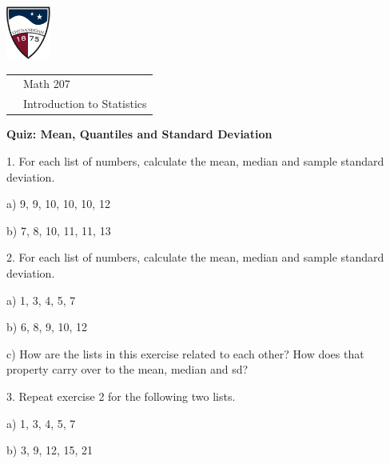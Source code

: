 \documentclass[10pt]{article}
\begin{document}
\pagestyle{empty}

\href{http://www.su.edu}{\includegraphics[height=1.75cm]{sulogo.eps}}
\vspace{-1.69cm}

{\small\hfill
\begin{tabular}{cl}
 & Math 207\\ & Introduction to Statistics\\
\end{tabular}
}

\setlength{\baselineskip}{1.05\baselineskip}

\begin{center}
\textbf{\large Quiz:  Mean, Quantiles and Standard Deviation}
\end{center}

1. For each list of numbers, calculate the mean, median and sample
standard deviation.

\hspace{10pt} a) 9, 9, 10, 10, 10, 12
\vspace{.45in}

\hspace{10pt} b) 7, 8, 10, 11, 11, 13
\vspace{.45in}

2. For each list of numbers, calculate the mean, median and sample
standard deviation.  

\hspace{10pt} a) 1, 3, 4, 5, 7
\vspace{.45in}

\hspace{10pt} b) 6, 8, 9, 10, 12
\vspace{.45in}

\hspace{10pt} c)  How are the lists in this exercise related to each other?
How does that property carry over to the mean, median and sd?
\vspace{.7in}


3. Repeat exercise 2 for the following two lists.

\hspace{10pt} a) 1, 3, 4, 5, 7
\vspace{.6in}

\hspace{10pt} b) 3, 9, 12, 15, 21
\vspace{.6in}

\vfill
\eject
\end{document}
